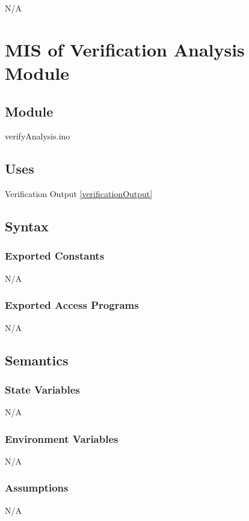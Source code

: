 \documentclass[12pt, titlepage]{article}
\begin{document}
N/A

  \section{MIS of Verification Analysis Module} \label{verificationAnalysis} 

\subsection{Module}

verifyAnalysis.ino

\subsection{Uses}

Verification Output \ref{verificationOutput}
\subsection{Syntax}

\subsubsection{Exported Constants}
N/A
\subsubsection{Exported Access Programs}

N/A

\subsection{Semantics}

\subsubsection{State Variables}

N/A

\subsubsection{Environment Variables}

N/A

\subsubsection{Assumptions}

N/A
\end{document}
